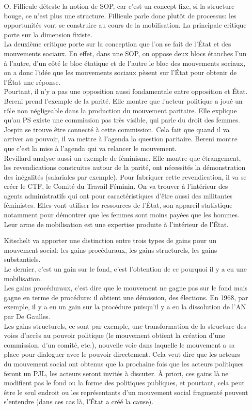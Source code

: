 \documentclass[10pt, a4paper, openany]{book}
\begin{document}
O. Fillieule déteste la notion de SOP, car c'est un concept fixe, si la structure bouge, ce n'est plus une structure. Fillieule parle donc plutôt de processus: les opportunités vont se construire au cours de la mobilisation. La principale critique porte sur la dimension fixiste. \\
La deuxième critique porte sur la conception que l'on se fait de l'État et des mouvements sociaux. En effet, dans une SOP, on oppose deux blocs étanches l'un à l'autre, d'un côté le bloc étatique et de l'autre le bloc des mouvements sociaux, on a donc l'idée que les mouvements sociaux pèsent sur l'État pour obtenir de l'État une réponse. \\
Pourtant, il n'y a pas une opposition aussi fondamentale entre opposition et État. Bereni prend l'exemple de la parité. Elle montre que l'acteur politique a joué un rôle non négligeable dans la production du mouvement paritaire. Elle explique qu'au PS existe une commission pas très visible, qui parle du droit des femmes. Jospin se trouve être connecté à cette commission. Cela fait que quand il va arriver au pouvoir, il va mettre à l'agenda la question paritaire. Bereni montre que c'est la mise à l'agenda qui va relancer le mouvement. \\
Revillard analyse aussi un exemple de féminisme. Elle montre que étrangement, les revendications construites autour de la parité, ont nécessités la démonstration des inégalités (salariales par exemple). Pour fabriquer cette revendication, il va se créer le CTF, le Comité du Travail Féminin. On va trouver à l'intérieur des agents administratifs qui ont pour caractéristiques d'être aussi des militantes féministes. Elles vont utiliser les ressources de l'État, son appareil statistique notamment pour démontrer que les femmes sont moins payées que les hommes. Leur arme de mobilisation est une expertise produite à l'intérieur de l'État. 


Kitschelt va apporter une distinction entre trois types de gains pour un mouvement social: les gains procéduraux, les gains structurels, les gains substantiels. \\
Le dernier, c'est un gain sur le fond, c'est l'obtention de ce pourquoi il y a eu une mobilisation. \\
Les gains procéduraux, c'est dire que le mouvement ne gagne pas sur le fond mais gagne en terme de procédure: il obtient une démission, des élections. En 1968, par exemple, il y a eu un gain sur la procédure puisqu'il y a eu la dissolution de l'AN par De Gaulles. \\
Les gains structurels, ce sont par exemple, une transformation de la structure des voies d'accès au pouvoir politique (le mouvement obtient la création d'une commission, d'un comité, etc.), nouvelle voie dans laquelle le mouvement a sa place pour dialoguer avec le pouvoir directement. Cela veut dire que les acteurs du mouvement social ont obtenus que la prochaine fois que les acteurs politiques feront un PJL, les acteurs seront invités à discuter. À priori, ces gains là ne modifient pas le fond ou la forme des politiques publiques, et pourtant, cela peut être le seul endroit ou les représentants d'un mouvement social fragmenté peuvent s'entendre (dans ces cas là, l'État a créé la cause). 
\end{document}
